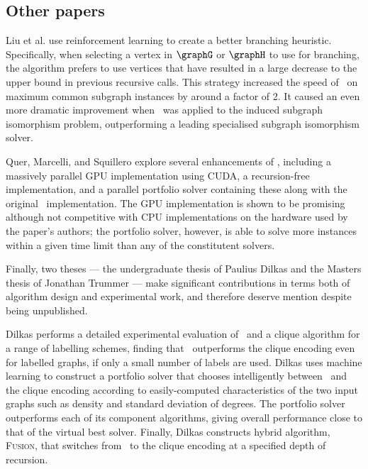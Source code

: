 \subsection{Other papers}

Liu et al. \cite{DBLP:conf/aaai/0001LJ020} use reinforcement learning to create a better branching
heuristic.  Specifically, when selecting a vertex in $\graphG$ or $\graphH$ to use for branching,
the algorithm prefers to use vertices that have resulted in a large decrease to the upper bound
in previous recursive calls.  This strategy increased the speed of \McSplit\ on maximum common subgraph
instances by around a factor of 2.  It caused an even more dramatic improvement when \McSplit\ was
applied to the induced subgraph isomorphism problem, outperforming a leading specialised subgraph
isomorphism solver.

Quer, Marcelli, and Squillero \cite{DBLP:journals/computation/QuerMS20}
explore several enhancements of \McSplit,
including a massively parallel GPU implementation using CUDA, a recursion-free implementation,
and a parallel portfolio solver containing these along with the original \McSplit\
implementation.  The GPU implementation is shown to be promising although not competitive
with CPU implementations on the hardware used by the paper's authors; the portfolio solver,
however, is able to solve more instances within a given time limit than any of the
constitutent solvers.

Finally, two theses --- the undergraduate thesis of Paulius Dilkas and
the Masters thesis of Jonathan Trummer --- make significant contributions
in terms both of algorithm design and experimental work, and therefore
deserve mention despite being unpublished.

Dilkas \cite{dilkas2018} performs a detailed experimental evaluation
of \McSplit\ and a clique algorithm for a range of labelling schemes, finding that \McSplit\
outperforms the clique encoding even for labelled graphs, if only a small number of labels are
used.  Dilkas uses machine learning to construct a portfolio solver that chooses intelligently
between \McSplit\ and the clique encoding according to easily-computed characteristics of the
two input graphs such as density and standard deviation of degrees. The portfolio solver
outperforms each of its component algorithms, giving overall performance close to that of the virtual
best solver.  Finally, Dilkas constructs hybrid algorithm, \textsc{Fusion}, that switches
from \McSplit\ to the clique encoding at a specified depth of recursion.


